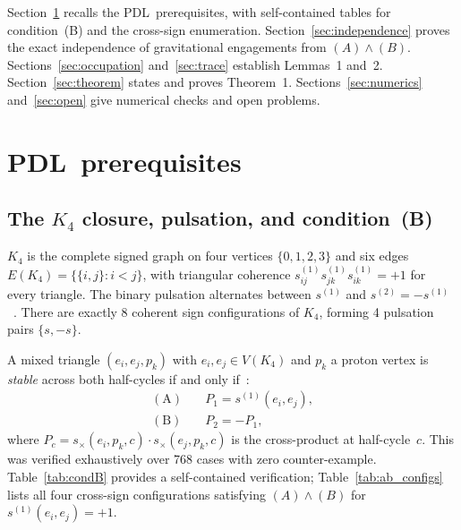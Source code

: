 \documentclass[11pt,a4paper]{article}
\theoremstyle{definition}
\newcommand{\PDL}{\textnormal{PDL}}
\newcommand{\Kfour}{K_4}
\begin{document}
Section~\ref{sec:prereq} recalls the \PDL\ prerequisites, with self-contained tables for condition~(B) and the cross-sign enumeration. Section~\ref{sec:independence} proves the exact independence of gravitational engagements from $(A)\wedge(B)$. Sections~\ref{sec:occupation} and~\ref{sec:trace} establish Lemmas~1 and~2. Section~\ref{sec:theorem} states and proves Theorem~1. Sections~\ref{sec:numerics} and~\ref{sec:open} give numerical checks and open problems.

\section{\PDL\ prerequisites}
\label{sec:prereq}

\subsection{The \texorpdfstring{$K_4$}{K4} closure, pulsation, and condition~(B)}

$\Kfour$ is the complete signed graph on four vertices $\{0,1,2,3\}$ and six edges $E(\Kfour) = \{\{i,j\}:i<j\}$, with triangular coherence $s^{(1)}_{ij}s^{(1)}_{jk}s^{(1)}_{ik} = +1$ for every triangle. The binary pulsation alternates between $s^{(1)}$ and $s^{(2)} = -s^{(1)}$~\cite{PDL_Main_2026}. There are exactly 8 coherent sign configurations of $\Kfour$, forming 4 pulsation pairs $\{s,-s\}$.

A mixed triangle $(e_i,e_j,p_k)$ with $e_i,e_j \in V(\Kfour)$ and $p_k$ a proton vertex is \emph{stable} across both half-cycles if and only if~\cite{PDL_D29_2026}:
\begin{align}
\mathrm{(A)}&\quad P_1 = s^{(1)}(e_i,e_j), \label{eq:condA}\\
\mathrm{(B)}&\quad P_2 = -P_1, \label{eq:condB}
\end{align}
where $P_c = s_\times(e_i,p_k,c)\cdot s_\times(e_j,p_k,c)$ is the cross-product at half-cycle~$c$. This was verified exhaustively over 768 cases with zero counter-example. Table~\ref{tab:condB} provides a self-contained verification; Table~\ref{tab:ab_configs} lists all four cross-sign configurations satisfying $(A)\wedge(B)$ for $s^{(1)}(e_i,e_j) = +1$.
\end{document}
